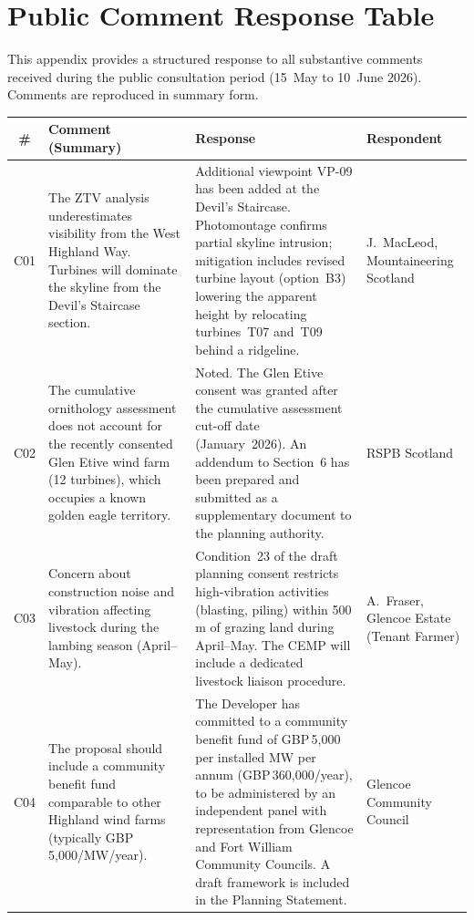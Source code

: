 \section{Public Comment Response Table}

This appendix provides a structured response to all substantive comments received during the public consultation period (15~May to 10~June 2026). Comments are reproduced in summary form.

\vspace{8pt}
\renewcommand{\arraystretch}{1.35}
\footnotesize
\begin{tabularx}{\linewidth}{@{}c >{\raggedright\arraybackslash}p{3.5cm} >{\raggedright\arraybackslash}X >{\raggedright\arraybackslash}p{3.5cm} @{}}
\toprule
\rowcolor{accent}
\color{white}\bfseries \# & \color{white}\bfseries Comment (Summary) & \color{white}\bfseries Response & \color{white}\bfseries Respondent \\
\midrule
\rowcolor{rowshade}
C01 & The ZTV analysis underestimates visibility from the West Highland Way. Turbines will dominate the skyline from the Devil's Staircase section. & Additional viewpoint VP-09 has been added at the Devil's Staircase. Photomontage confirms partial skyline intrusion; mitigation includes revised turbine layout (option~B3) lowering the apparent height by relocating turbines~T07 and~T09 behind a ridgeline. & J.\ MacLeod, Mountaineering Scotland \\
C02 & The cumulative ornithology assessment does not account for the recently consented Glen Etive wind farm (12 turbines), which occupies a known golden eagle territory. & Noted. The Glen Etive consent was granted after the cumulative assessment cut-off date (January~2026). An addendum to Section~6 has been prepared and submitted as a supplementary document to the planning authority. & RSPB Scotland \\
\rowcolor{rowshade}
C03 & Concern about construction noise and vibration affecting livestock during the lambing season (April--May). & Condition~23 of the draft planning consent restricts high-vibration activities (blasting, piling) within 500\,m of grazing land during April--May. The CEMP will include a dedicated livestock liaison procedure. & A.\ Fraser, Glencoe Estate (Tenant Farmer) \\
C04 & The proposal should include a community benefit fund comparable to other Highland wind farms (typically GBP\,5,000/MW/year). & The Developer has committed to a community benefit fund of GBP\,5,000 per installed MW per annum (GBP\,360,000/year), to be administered by an independent panel with representation from Glencoe and Fort William Community Councils. A draft framework is included in the Planning Statement. & Glencoe Community Council \\

\end{tabularx}
